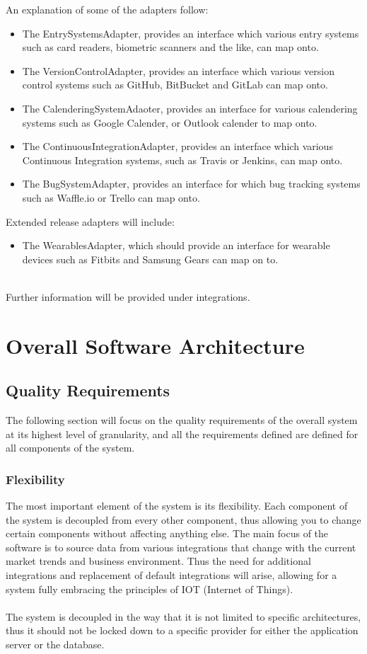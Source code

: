 \documentclass[11pt,a4paper]{article}
\begin{document}
An explanation of some of the adapters follow:
\begin{itemize}
	\item The EntrySystemsAdapter, provides an interface which various entry systems such as card readers, biometric scanners and the like, can map onto.
	\item The VersionControlAdapter, provides an interface which various version control systems such as GitHub, BitBucket and GitLab can map onto.
	\item The CalenderingSystemAdaoter, provides an interface for various calendering systems such as Google Calender, or Outlook calender to map onto.
	\item The ContinuousIntegrationAdapter, provides an interface which various Continuous Integration systems, such as Travis or Jenkins, can map onto.
	\item The BugSystemAdapter, provides an interface for which bug tracking systems such as Waffle.io or Trello can map onto.\\
\end{itemize}
Extended release adapters will include:
\begin{itemize}
	\item The WearablesAdapter, which should provide an interface for wearable devices such as Fitbits and Samsung Gears can map on to.\\\\ 
\end{itemize}
Further information will be provided under integrations.

\section{Overall Software Architecture}

\subsection{Quality Requirements}
The following section will focus on the quality requirements of the overall system at its highest level of granularity, and all the requirements defined are defined for all components of the system.

\subsubsection{Flexibility}
The most important element of the system is its flexibility. Each component of the system is decoupled from every other component, thus allowing you to change certain components without affecting anything else. The main focus of the software is to source data from various integrations that change with the current market trends and business environment. Thus the need for additional integrations and replacement of default integrations will arise, allowing for a system fully embracing the principles of IOT (Internet of Things).\\ \\
The system is decoupled in the way that it is not limited to specific architectures, thus it should not be locked down to a specific provider for either the application server or the database.
\end{document}
